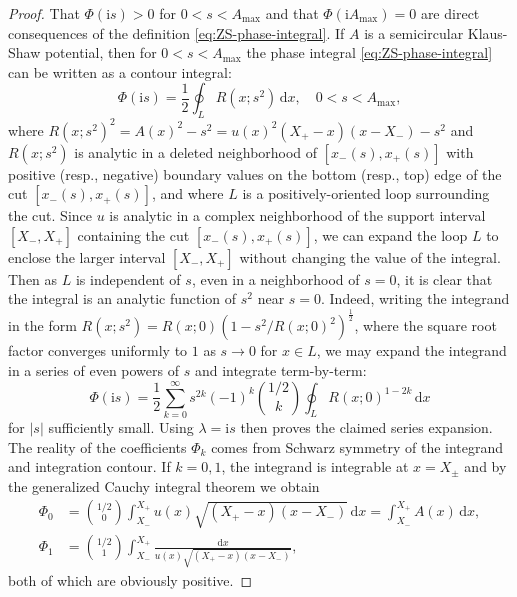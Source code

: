 \documentclass[12pt]{amsart}
\numberwithin{equation}{section}
\newcommand{\dd}{\mathrm{d}}
\newcommand{\ii}{\mathrm{i}}
\newcommand{\phaseint}{\Phi}
\begin{document}
\begin{proof}
That $\phaseint(\ii s)>0$ for $0< s<A_\mathrm{max}$ and that $\phaseint(\ii A_\mathrm{max})=0$ are direct consequences of the definition \eqref{eq:ZS-phase-integral}.
If $A$ is a semicircular Klaus-Shaw potential, then for $0<s<A_\mathrm{max}$ the phase integral \eqref{eq:ZS-phase-integral} can be written as a contour integral:
\begin{equation}
\phaseint(\ii s)=\frac{1}{2}\oint_L R(x;s^2)\,\dd x,\quad 0<s<A_\mathrm{max},
\label{eq:phase-integral-loop}
\end{equation}
where $R(x;s^2)^2=A(x)^2-s^2=u(x)^2(X_+-x)(x-X_-)-s^2$ and $R(x;s^2)$ is analytic in a deleted neighborhood of $[x_-(s),x_+(s)]$ with positive (resp., negative) boundary values on the bottom (resp., top) edge of the cut $[x_-(s),x_+(s)]$, and where $L$ is a positively-oriented loop surrounding the cut.  Since $u$ is analytic in a complex neighborhood of the support interval $[X_-,X_+]$ containing the cut $[x_-(s),x_+(s)]$, we can expand the loop $L$ to enclose the larger interval $[X_-,X_+]$ without changing the value of the integral.  Then as $L$ is independent of $s$, even in a neighborhood of $s=0$, it is clear that the integral is an analytic function of $s^2$ near $s=0$.  Indeed, writing the integrand in the form $R(x;s^2)=R(x;0)(1-s^2/R(x;0)^2)^{\frac{1}{2}}$, where the square root factor converges uniformly to $1$ as $s\to 0$ for $x\in L$, we may expand the integrand in a series of even powers of $s$ and integrate term-by-term:
\begin{equation}
\phaseint(\ii s)=\frac{1}{2}\sum_{k=0}^\infty s^{2k}(-1)^k\binom{1/2}{k}\oint_LR(x;0)^{1-2k}\,\dd x
\end{equation}
for $|s|$ sufficiently small.  Using $\lambda=\ii s$ then proves the claimed series expansion.  The reality of the coefficients $\phaseint_k$  comes from Schwarz symmetry of the integrand and integration contour.  If $k=0,1$, the integrand is integrable at $x=X_\pm$ and by the generalized Cauchy integral theorem we obtain
\begin{equation}
\begin{split}
\phaseint_0&=\binom{1/2}{0}\int_{X_-}^{X_+}u(x)\sqrt{(X_+-x)(x-X_-)}\,\dd x=\int_{X_-}^{X_+}A(x)\,\dd x,\\ \phaseint_1&=\binom{1/2}{1}\int_{X_-}^{X_+}\frac{\dd x}{u(x)\sqrt{(X_+-x)(x-X_-)}},
\end{split}
\label{eq:Psi0-Psi1}
\end{equation}
both of which are obviously positive.
\end{proof}
\end{document}
